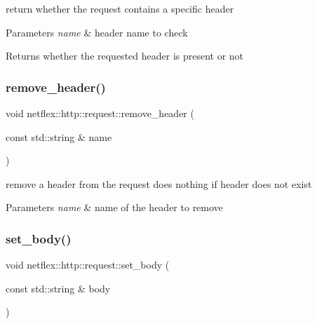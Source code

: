 return whether the request contains a specific header


\begin{DoxyParams}{Parameters}
{\em name} & header name to check \\
\hline
\end{DoxyParams}
\begin{DoxyReturn}{Returns}
whether the requested header is present or not 
\end{DoxyReturn}
\mbox{\label{classnetflex_1_1http_1_1request_ab598096641d91c5dc961e153cf47e445}} 
\subsubsection{\texorpdfstring{remove\+\_\+header()}{remove\_header()}}
{\footnotesize\ttfamily void netflex\+::http\+::request\+::remove\+\_\+header (\begin{DoxyParamCaption}\item[{const std\+::string \&}]{name }\end{DoxyParamCaption})}

remove a header from the request does nothing if header does not exist


\begin{DoxyParams}{Parameters}
{\em name} & name of the header to remove \\
\hline
\end{DoxyParams}
\mbox{\label{classnetflex_1_1http_1_1request_aa47455728e271b519826dc060f829c48}} 
\subsubsection{\texorpdfstring{set\+\_\+body()}{set\_body()}}
{\footnotesize\ttfamily void netflex\+::http\+::request\+::set\+\_\+body (\begin{DoxyParamCaption}\item[{const std\+::string \&}]{body }\end{DoxyParamCaption})}


